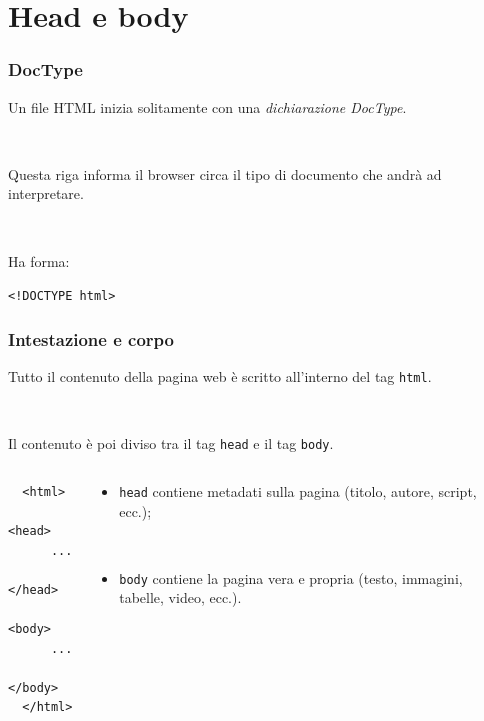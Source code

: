 \documentclass[]{beamer}
\begin{document}
\section{Head e body}

\begin{frame}
\frametitle{DocType}
Un file HTML inizia solitamente con una \emph{dichiarazione DocType}.\pause

~

Questa riga informa il browser circa il tipo di documento che andrà ad interpretare.\pause

~

Ha forma:
\begin{center}
\texttt{<!DOCTYPE html>}
\end{center}
\end{frame}

\begin{frame}[fragile]
\frametitle{Intestazione e corpo}
Tutto il contenuto della pagina web è scritto all'interno del tag \alert<1>{\texttt{html}}.\pause
  
~
  
Il contenuto è poi diviso tra il tag \alert<2>{\texttt{head}} e il tag \alert<2>{\texttt{body}}.

\begin{columns}
\begin{column}{0.2\textwidth}
\begin{scriptsize}
\begin{verbatim}
  <html>
    <head>
      ...
    </head>
    <body>
      ...
    </body>
  </html>
\end{verbatim}
\end{scriptsize}\pause
\end{column}
\begin{column}{0.7\textwidth}

\begin{itemize}
  \item \alert<3>{\texttt{head}} contiene metadati sulla pagina (titolo, autore, script, ecc.);\pause
  
  ~
  
  \item \alert<4>{\texttt{body}} contiene la pagina vera e propria (testo, immagini, tabelle, video, ecc.).
\end{itemize}
\end{column}
\end{columns}  
\end{frame}
\end{document}
